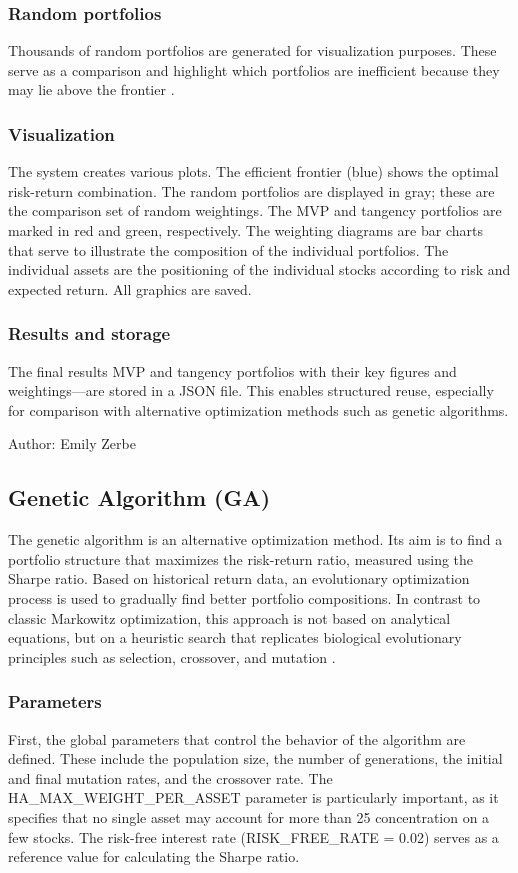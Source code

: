 \documentclass{agasthesis}
\begin{document}
\subsubsection{Random portfolios}
Thousands of random portfolios are generated for visualization purposes. These serve as a comparison and highlight which 
portfolios are inefficient because they may lie above the frontier \cite[p. 225-310]{elton_modern_2009}.
\subsubsection{Visualization}
The system creates various plots. The efficient frontier (blue) shows the optimal risk-return combination. The random portfolios are displayed 
in gray; these are the comparison set of random weightings. The MVP and tangency portfolios are marked in red and green, respectively. 
The weighting diagrams are bar charts that serve to illustrate the composition of the individual portfolios. The individual assets are 
the positioning of the individual stocks according to risk and expected return. All graphics are saved.
\subsubsection{Results and storage}
The final results MVP and tangency portfolios with their key figures and weightings—are stored in a JSON file. This enables structured reuse, 
especially for comparison with alternative optimization methods such as genetic algorithms.

Author: Emily Zerbe

\subsection{Genetic Algorithm (GA)}
The genetic algorithm is an alternative optimization method. Its aim is to find a portfolio structure that maximizes the risk-return ratio, measured using the Sharpe ratio. 
Based on historical return data, an evolutionary optimization process is used to gradually find better portfolio compositions. In contrast to classic Markowitz optimization, 
this approach is not based on analytical equations, but on a heuristic search that replicates biological evolutionary principles such as selection, crossover, and mutation \cite[p. 203]{soldatos_big_2022}.
\subsubsection{Parameters}
First, the global parameters that control the behavior of the algorithm are defined. These include the population size, the number of generations, the initial and final mutation rates, and the crossover rate. 
The HA_MAX_WEIGHT_PER_ASSET parameter is particularly important, as it specifies that no single asset may account for more than 25%
concentration on a few stocks. The risk-free interest rate (RISK_FREE_RATE = 0.02) serves as a reference value for calculating the Sharpe ratio.
\end{document}
